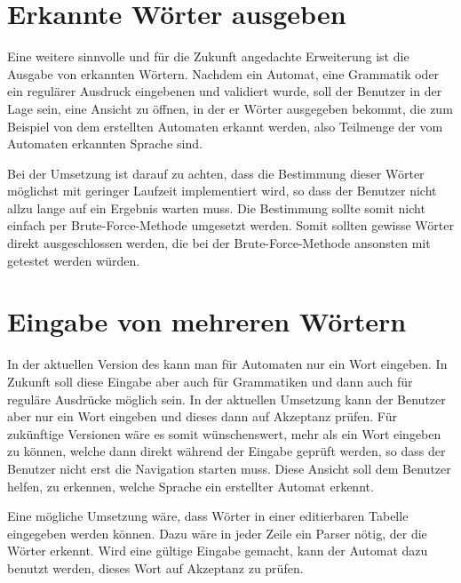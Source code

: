 \section{Erkannte Wörter ausgeben}\label{PerspectiveDetectedWords}

Eine weitere sinnvolle und für die Zukunft angedachte Erweiterung ist die Ausgabe
von erkannten Wörtern. Nachdem ein Automat, eine Grammatik oder ein regulärer
Ausdruck eingebenen und validiert wurde, soll der Benutzer in der Lage sein, eine
Ansicht zu öffnen, in der er Wörter ausgegeben bekommt, die zum Beispiel von dem
erstellten Automaten erkannt werden, also Teilmenge der vom Automaten erkannten
Sprache sind.\vspace{10pt}

\newpage
Bei der Umsetzung ist darauf zu achten, dass die Bestimmung dieser Wörter
möglichst mit geringer Laufzeit implementiert wird, so dass der Benutzer nicht
allzu lange auf ein Ergebnis warten muss. Die Bestimmung sollte somit nicht
einfach per Brute-Force-Methode umgesetzt werden. Somit sollten gewisse Wörter
direkt ausgeschlossen werden, die bei der Brute-Force-Methode ansonsten mit
getestet werden würden.\vspace{10pt}


\section{Eingabe von mehreren Wörtern}\label{PerspectiveMultiplyWordInput}

In der aktuellen Version des \gtitools kann man für Automaten nur ein Wort
eingeben. In Zukunft soll diese Eingabe aber auch für Grammatiken und dann auch
für reguläre Ausdrücke möglich sein. In der aktuellen Umsetzung kann der Benutzer
aber nur ein Wort eingeben und dieses dann auf Akzeptanz prüfen. Für zukünftige
Versionen wäre es somit wünschenswert, mehr als ein Wort eingeben zu können,
welche dann direkt während der Eingabe geprüft werden, so dass der Benutzer
nicht erst die Navigation starten muss. Diese Ansicht soll dem Benutzer helfen,
zu erkennen, welche Sprache ein erstellter Automat erkennt.\vspace{10pt}

Eine mögliche Umsetzung wäre, dass Wörter in einer editierbaren Tabelle
eingegeben werden können. Dazu wäre in jeder Zeile ein Parser nötig, der die
Wörter erkennt. Wird eine gültige Eingabe gemacht, kann der Automat dazu
benutzt werden, dieses Wort auf Akzeptanz zu prüfen.\vspace{10pt}


